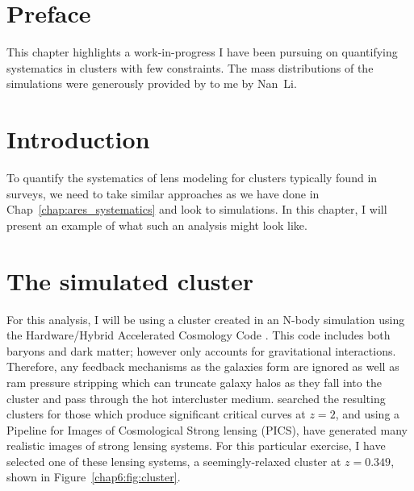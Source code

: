 \section{Preface}

This chapter highlights a work-in-progress I have been pursuing on quantifying systematics in clusters with few constraints. The mass distributions of the simulations were generously provided by to me by Nan~Li.

\section{Introduction}

To quantify the systematics of lens modeling for clusters typically found in surveys, we need to take similar approaches as we have done in Chap~\ref{chap:ares_systematics} and look to simulations. In this chapter, I will present an example of what such an analysis might look like.

\section{The simulated cluster}

For this analysis, I will be using a cluster created in an N-body simulation using the Hardware/Hybrid Accelerated Cosmology Code \citep[HACC; ][]{Habib:2016cy}. This code includes both baryons and dark matter; however only accounts for gravitational interactions. Therefore, any feedback mechanisms as the galaxies form are ignored as well as ram pressure stripping which can truncate galaxy halos as they fall into the cluster and pass through the hot intercluster medium. \citet{Li:2016ek} searched the resulting clusters for those which produce significant critical curves at $z=2$, and using a Pipeline for Images of Cosmological Strong lensing (PICS), have generated many realistic images of strong lensing systems. For this particular exercise, I have selected one of these lensing systems, a seemingly-relaxed cluster at $z=0.349$, shown in Figure~\ref{chap6:fig:cluster}.


